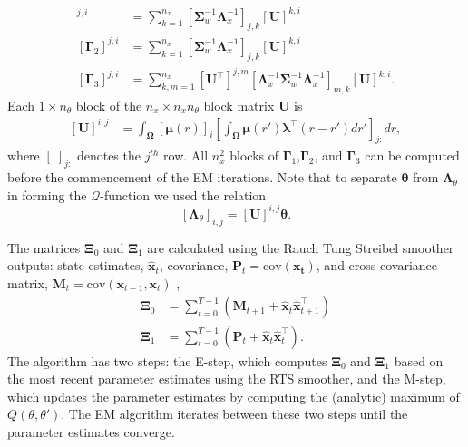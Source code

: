 \documentclass[journal]{IEEEtran}
\newcommand{\cut}[1]{\textcolor{cyan}{#1}}
\begin{document}
\begin{align}
 [\boldsymbol\Gamma_1]^{j,i} & =\sum_{k=1}^{n_x}[\boldsymbol\Sigma_{w}^{-1}\boldsymbol\Lambda_{x}^{-1}]_{j,k}[\mathbf U]^{k,i}\label{eq:Gamma1} \\ 
 [\boldsymbol\Gamma_2]^{j,i} & =\sum_{k=1}^{n_x}[\boldsymbol\Sigma_{w}^{-1}\boldsymbol\Lambda_{x}^{-1}]_{j,k}[\mathbf U]^{k,i}\label{eq:Gamma2} \\
[\boldsymbol\Gamma_3]^{j,i}&=\sum_{k,m=1}^{n_x}[\mathbf{U}^{\top}]^{j,m}[ \boldsymbol\Lambda_{x}^{-1}\boldsymbol\Sigma_{w}^{-1}\boldsymbol\Lambda_{x}^{-1}]_{m,k}[\mathbf{U}]^{k,i}\label{eq:Gamma3}.
\end{align}
Each $1\times n_{\theta}$ block of the $n_x \times n_x n_{\theta}$ block matrix $\mathbf U$ is
\begin{align}
\left[ \mathbf U\right] ^{i,j}&=\int_{\boldsymbol \Omega}\left[\boldsymbol\mu(r) \right]_i \left[\int_{\boldsymbol\Omega} \boldsymbol\mu\left(r'\right)\boldsymbol \lambda^\top \left(r-r'\right) dr'\right]_{j:} dr,
\end{align}
where $[.]_{j:} $ denotes the $j^{th}$ row. All $n_x^2$ blocks of $\boldsymbol\Gamma_1$,$\boldsymbol\Gamma_2$, and $\boldsymbol\Gamma_3$  can be computed before the commencement of the EM iterations. Note that to separate $\boldsymbol\theta$ from $\boldsymbol\Lambda_{\theta}$ in forming the $\mathcal{Q}$-function we used the relation
\begin{equation}
\left[ \boldsymbol\Lambda_{\theta}\right] _{i,j} =\left[ \mathbf U\right]^{i,j}\boldsymbol\theta. 
\end{equation}

The matrices $\boldsymbol\Xi_0$ and $\boldsymbol\Xi_1$ are calculated using the Rauch Tung Streibel smoother \cite{RAUCH1965} outputs: state estimates, $\hat{\mathbf x}_t$, covariance, $\mathbf P_t=\mathrm{cov}(\mathbf{x_t})$, and cross-covariance matrix, $\mathbf M_t=\mathrm{cov}(\mathbf{x}_{t-1},\mathbf{x}_{t})$ \cite{Gibsona2005},
\begin{align}\label{eq:Xivariables}
\boldsymbol\Xi_0&=\sum_{t=0}^{T-1}\left(\mathbf M_{t+1}+\mathbf{\hat x}_t\mathbf{\hat x}_{t+1}^\top\right) \\
 \boldsymbol\Xi_1&=\sum_{t=0}^{T-1}\left(\mathbf P_t+\mathbf{\hat x}_t\mathbf{\hat x}_t^\top\right).
\end{align}
The algorithm has two steps: the E-step, which computes $\boldsymbol\Xi_0$ and $\boldsymbol\Xi_1$ based on the most recent parameter estimates using the RTS smoother, and the M-step, which updates the parameter estimates by computing the (analytic) maximum of $Q(\theta,\theta')$. The EM algorithm iterates between these two steps until the parameter estimates converge.
\end{document}
